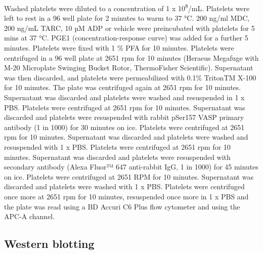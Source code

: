 \documentclass[11pt,twoside]{bristolthesis}
\begin{document}
Washed platelets were diluted to a concentration of 1 x 10\textsuperscript{8}/mL. Platelets were left to rest in a 96 well plate for 2 minutes to warm to 37 °C. 200 ng/ml MDC, 200 ng/mL TARC, 10 µM ADP or vehicle were preincubated with platelets for 5 mins at 37 °C. PGE1 (concentration-response curve) was added for a further 5 minutes. Platelets were fixed with 1 \% PFA for 10 minutes. Platelets were centrifuged in a 96 well plate at 2651 rpm for 10 minutes (Heraeus Megafuge with M-20 Microplate Swinging Bucket Rotor, ThermoFisher Scientific). Supernatant was then discarded, and platelets were permeabilized with 0.1\% TritonTM X-100 for 10 minutes. The plate was centrifuged again at 2651 rpm for 10 minutes. Supernatant was discarded and platelets were washed and resuspended in 1 x PBS. Platelets were centrifuged at 2651 rpm for 10 minutes. Supernatant was discarded and platelets were resuspended with rabbit pSer157 VASP primary antibody (1 in 1000) for 30 minutes on ice. Platelets were centrifuged at 2651 rpm for 10 minutes. Supernatant was discarded and platelets were washed and resuspended with 1 x PBS. Platelets were centrifuged at 2651 rpm for 10 minutes. Supernatant was discarded and platelets were resuspended with secondary antibody (Alexa Fluor™ 647 anti-rabbit IgG, 1 in 1000) for 45 minutes on ice. Platelets were centrifuged at 2651 RPM for 10 minutes. Supernatant was discarded and platelets were washed with 1 x PBS. Platelets were centrifuged once more at 2651 rpm for 10 minutes, resuspended once more in 1 x PBS and the plate was read using a BD Accuri C6 Plus flow cytometer and using the APC-A channel.

\hypertarget{western-blotting}{%
\subsection{Western blotting}\label{western-blotting}}
\end{document}
